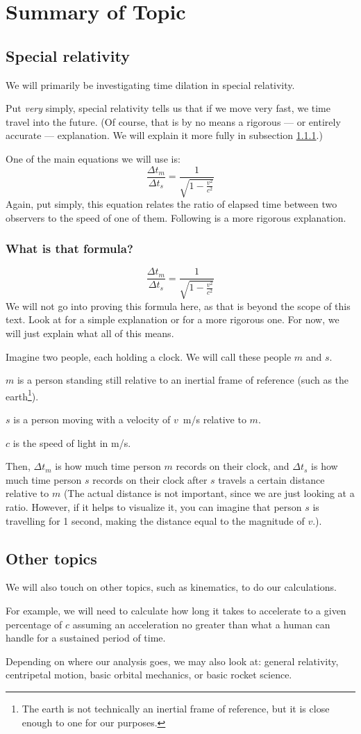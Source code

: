 \chapter{Summary of Topic}
	\section{Special relativity}
		We will primarily be investigating time dilation in special relativity.

		Put \emph{very} simply, special relativity tells us that if we move very fast, we time travel into the future. (Of course, that is by no means a rigorous --- or entirely accurate --- explanation. We will explain it more fully in subsection \ref{summary:formula}.)

		One of the main equations we will use is:
		\[\frac{\Delta t_m}{\Delta t_s} = \frac{1}{\sqrt{1 - \frac{v^2}{c^2}}}\]
		Again, put simply, this equation relates the ratio of elapsed time between two observers to the speed of one of them. Following is a more rigorous explanation.
		\subsection{What is that formula?}
			\label{summary:formula}
			\[\frac{\Delta t_m}{\Delta t_s} = \frac{1}{\sqrt{1 - \frac{v^2}{c^2}}}\]
			We will not go into proving this formula here, as that is beyond the scope of this text. Look at \parencite[p.~580 -- 586]{textbook} for a simple explanation or \parencite{einstein1916} for a more rigorous one. For now, we will just explain what all of this means.

			Imagine two people, each holding a clock. We will call these people $m$ and $s$.

			$m$ is a person standing still relative to an inertial frame of reference (such as the earth\footnote{The earth is not technically an inertial frame of reference, but it is close enough to one for our purposes.}).

			$s$ is a person moving with a velocity of $v$~\si{\m/\s} relative to $m$.

			$c$ is the speed of light in \si{\m/\s}.

			Then, $\Delta t_m$ is how much time person $m$ records on their clock, and $\Delta t_s$ is how much time person $s$ records on their clock after $s$ travels a certain distance relative to $m$ (The actual distance is not important, since we are just looking at a ratio. However, if it helps to visualize it, you can imagine that person $s$ is travelling for 1 second, making the distance equal to the magnitude of $v$.).
	\section{Other topics}
		We will also touch on other topics, such as kinematics, to do our calculations.

		For example, we will need to calculate how long it takes to accelerate to a given percentage of $c$ assuming an acceleration no greater than what a human can handle for a sustained period of time.

		Depending on where our analysis goes, we may also look at: general relativity, centripetal motion, basic orbital mechanics, or basic rocket science.
